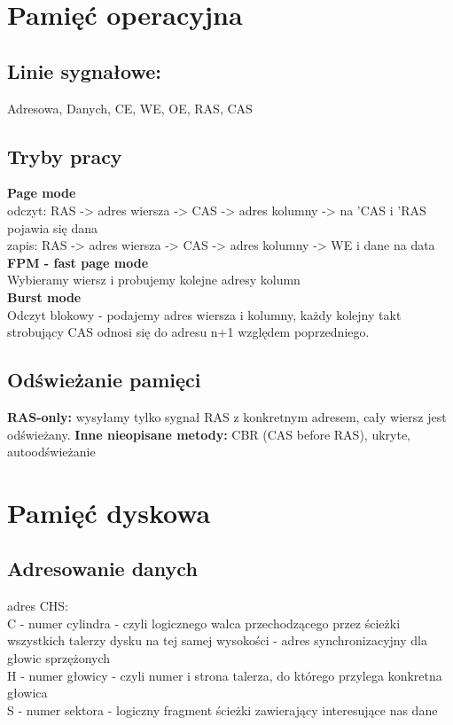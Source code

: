 \documentclass[a4paper]{article}
\begin{document}
\section{Pamięć operacyjna}
\subsection{Linie sygnałowe: }
Adresowa, Danych, CE, WE, OE, RAS, CAS
\subsection{Tryby pracy}
\textbf{Page mode}\\
odczyt: RAS -> adres wiersza -> CAS -> adres kolumny -> na 'CAS i 'RAS pojawia się dana\\
zapis: RAS -> adres wiersza -> CAS -> adres kolumny -> WE i dane na data\\
\textbf{FPM - fast page mode}\\
Wybieramy wiersz i probujemy kolejne adresy kolumn\\
\textbf{Burst mode}\\
Odczyt blokowy - podajemy adres wiersza i kolumny, każdy kolejny takt strobujący CAS odnosi się do adresu n+1 względem poprzedniego.\\
\subsection{Odświeżanie pamięci}
\textbf{RAS-only: } wysyłamy tylko sygnał RAS z konkretnym adresem, cały wiersz jest odświeżany.
\textbf{Inne nieopisane metody: } CBR (CAS before RAS), ukryte, autoodświeżanie

\newpage
\section{Pamięć dyskowa}
\subsection{Adresowanie danych}
adres CHS:\\
C - numer cylindra - czyli logicznego walca przechodzącego przez ścieżki wszystkich talerzy dysku na tej samej wysokości - adres synchronizacyjny dla głowic sprzężonych\\
H - numer głowicy - czyli numer i strona talerza, do którego przylega konkretna głowica\\
S - numer sektora - logiczny fragment ścieżki zawierający interesujące nas dane\\
\end{document}
